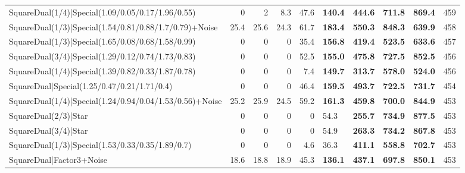\begin{tabular}{lrrrrllllr}
 SquareDual(1/4)|Special(1.09/0.05/0.17/1.96/0.55)       &          0   &          2   &          8.3 &            47.6 & \textbf{140.4} & \textbf{444.6} & \textbf{711.8} & \textbf{869.4}  &          459 \\
 SquareDual(1/3)|Special(1.54/0.81/0.88/1.7/0.79)+Noise  &         25.4 &         25.6 &         24.3 &            61.7 & \textbf{183.4} & \textbf{550.3} & \textbf{848.3} & \textbf{639.9}  &          458 \\
 SquareDual(1/3)|Special(1.65/0.08/0.68/1.58/0.99)       &          0   &          0   &          0   &            35.4 & \textbf{156.8} & \textbf{419.4} & \textbf{523.5} & \textbf{633.6}  &          457 \\
 SquareDual(3/4)|Special(1.29/0.12/0.74/1.73/0.83)       &          0   &          0   &          0   &            52.5 & \textbf{155.0} & \textbf{475.8} & \textbf{727.5} & \textbf{852.5}  &          456 \\
 SquareDual(1/4)|Special(1.39/0.82/0.33/1.87/0.78)       &          0   &          0   &          0   &             7.4 & \textbf{149.7} & \textbf{313.7} & \textbf{578.0} & \textbf{524.0}  &          456 \\
 SquareDual|Special(1.25/0.47/0.21/1.71/0.4)             &          0   &          0   &          0   &            46.4 & \textbf{159.5} & \textbf{493.7} & \textbf{722.5} & \textbf{731.7}  &          454 \\
 SquareDual(1/4)|Special(1.24/0.94/0.04/1.53/0.56)+Noise &         25.2 &         25.9 &         24.5 &            59.2 & \textbf{161.3} & \textbf{459.8} & \textbf{700.0} & \textbf{844.9}  &          453 \\
 SquareDual(2/3)|Star                                    &          0   &          0   &          0   &             0   & 54.3           & \textbf{255.7} & \textbf{734.9} & \textbf{877.5}  &          453 \\
 SquareDual(3/4)|Star                                    &          0   &          0   &          0   &             0   & 54.9           & \textbf{263.3} & \textbf{734.2} & \textbf{867.8}  &          453 \\
 SquareDual(1/3)|Special(1.53/0.33/0.35/1.89/0.7)        &          0   &          0   &          0   &             4.6 & 36.3           & \textbf{411.1} & \textbf{558.8} & \textbf{702.7}  &          453 \\
 SquareDual|Factor3+Noise                                &         18.6 &         18.8 &         18.9 &            45.3 & \textbf{136.1} & \textbf{437.1} & \textbf{697.8} & \textbf{850.1}  &          453 \\

\end{tabular}

